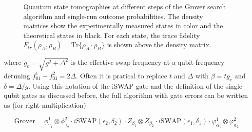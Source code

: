 \begin{figure}
	\centering
	\caption[Quantum state tomographies at different steps during the Grover search algorithm and single-run outcome probabilities]{Quantum state tomographies at different steps of the Grover search algorithm and single-run outcome probabilities. The density matrices show the experimentally measured states in color and the theoretical states in black. For each state, the trace fidelity $F_{tr}(\rho_A,\rho_B) = \mathrm{Tr}\{\rho_A\cdot\rho_B\}$ is shown above the density matrix.}
	\label{fig:grover_error_model}
\end{figure}

where $g_e = \sqrt{g^2+\Delta^2}$ is the effective swap frequency at a qubit frequency detuning $f_{01}^1-f_{01}^2 = 2\Delta$. Often it is pratical to replace $t$ and $\Delta$ with $\beta = t g_{e}$ and $\delta = \Delta / g$. Using this notation of the iSWAP gate and the definition of the single-qubit gates as discussed before, the full algorithm with gate errors can be written as (for right-multiplication)

\begin{equation}
\mathrm{Grover} = \phi_{\gamma_1}^1\otimes \phi_{\gamma_2}^2\cdot i\mathrm{SWAP}(\epsilon_2,\delta_2)\cdot Z_{\beta_1}\otimes Z_{\beta_2}\cdot i\mathrm{SWAP}(\epsilon_1,\delta_1)\cdot\varphi_{\alpha_1}^1\otimes \varphi_{\alpha_2}^2 \label{eq:grover_error_model}
\end{equation}

